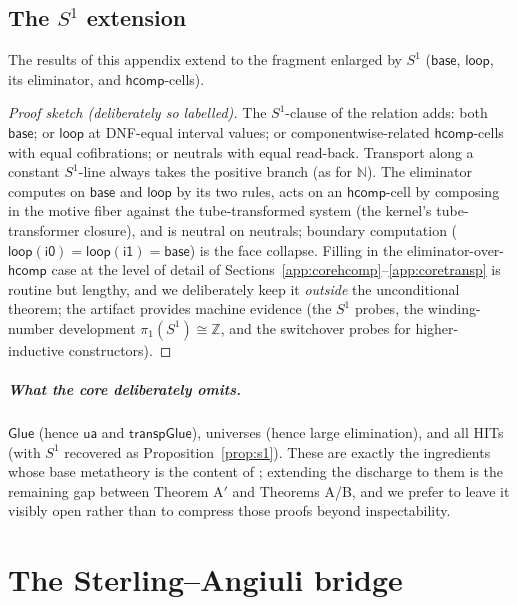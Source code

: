 \documentclass{lmcs}
\newcommand{\hcomp}{\mathsf{hcomp}}
\newcommand{\ua}{\mathsf{ua}}
\newcommand{\Glue}{\mathsf{Glue}}
\newcommand{\ii}{\mathsf{i1}}
\newcommand{\io}{\mathsf{i0}}
\begin{document}
\subsection{The $S^1$ extension}
\label{app:s1ext}

\begin{prop}\label{prop:s1}
  The results of this appendix extend to the fragment enlarged by
  $S^1$ ($\mathsf{base}$, $\mathsf{loop}$, its eliminator, and
  $\hcomp$-cells).
\end{prop}
\begin{proof}[Proof sketch (deliberately so labelled)]
  The $S^1$-clause of the relation adds: both $\mathsf{base}$;
  or $\mathsf{loop}$ at DNF-equal interval values; or
  componentwise-related $\hcomp$-cells with equal cofibrations; or
  neutrals with equal read-back.  Transport along a constant
  $S^1$-line always takes the positive branch (as for
  $\mathbb{N}$).  The eliminator computes on $\mathsf{base}$ and
  $\mathsf{loop}$ by its two rules, acts on an $\hcomp$-cell by
  composing in the motive fiber against the tube-transformed
  system (the kernel's tube-transformer closure), and is neutral
  on neutrals; boundary computation
  ($\mathsf{loop}(\io) = \mathsf{loop}(\ii) = \mathsf{base}$) is
  the face collapse.  Filling in the eliminator-over-$\hcomp$ case
  at the level of detail of
  Sections~\ref{app:corehcomp}--\ref{app:coretransp} is routine
  but lengthy, and we deliberately keep it \emph{outside} the
  unconditional theorem; the artifact provides machine evidence
  (the $S^1$ probes, the winding-number development
  $\pi_1(S^1) \cong \mathbb{Z}$, and the switchover probes for
  higher-inductive constructors).
\end{proof}

\subparagraph*{What the core deliberately omits.}  $\Glue$ (hence
$\ua$ and $\mathsf{transpGlue}$), universes (hence large
elimination), and all HITs (with $S^1$ recovered as
Proposition~\ref{prop:s1}).  These are exactly the ingredients
whose base metatheory is the content of
\cite{HuberNorm,SterlingAngiuli}; extending the discharge to them
is the remaining gap between Theorem A$'$ and Theorems A/B, and we
prefer to leave it visibly open rather than to compress those
proofs beyond inspectability.

\section{The Sterling--Angiuli bridge}
\label{app:bridge}
\end{document}
